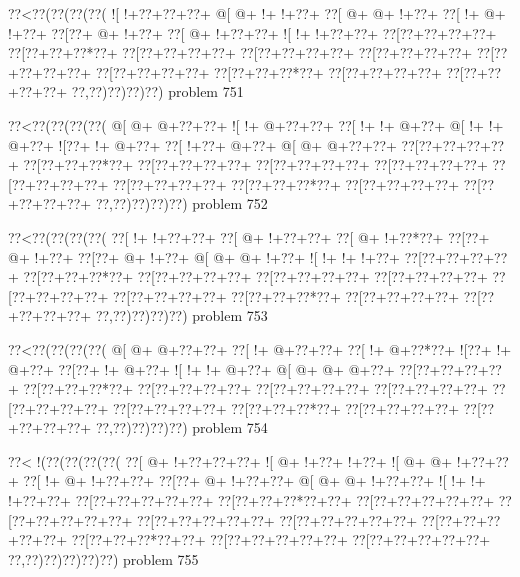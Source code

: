 \vbox{\vbox{\goo
\0??<\0??(\0??(\0??(\0??(
\- ![\- !+\0??+\0??+\0??+
\- @[\- @+\- !+\- !+\0??+
\0??[\- @+\- @+\- !+\0??+
\0??[\- !+\- @+\- !+\0??+
\0??[\0??+\- @+\- !+\0??+
\0??[\- @+\- !+\0??+\0??+
\- ![\- !+\- !+\0??+\0??+
\0??[\0??+\0??+\0??+\0??+
\0??[\0??+\0??+\0??*\0??+
\0??[\0??+\0??+\0??+\0??+
\0??[\0??+\0??+\0??+\0??+
\0??[\0??+\0??+\0??+\0??+
\0??[\0??+\0??+\0??+\0??+
\0??[\0??+\0??+\0??+\0??+
\0??[\0??+\0??+\0??*\0??+
\0??[\0??+\0??+\0??+\0??+
\0??[\0??+\0??+\0??+\0??+
\0??,\0??)\0??)\0??)\0??)
}
\hfil problem 751\hfil\break
}

\vbox{\vbox{\goo
\0??<\0??(\0??(\0??(\0??(
\- @[\- @+\- @+\0??+\0??+
\- ![\- !+\- @+\0??+\0??+
\0??[\- !+\- !+\- @+\0??+
\- @[\- !+\- !+\- @+\0??+
\- ![\0??+\- !+\- @+\0??+
\0??[\- !+\0??+\- @+\0??+
\- @[\- @+\- @+\0??+\0??+
\0??[\0??+\0??+\0??+\0??+
\0??[\0??+\0??+\0??*\0??+
\0??[\0??+\0??+\0??+\0??+
\0??[\0??+\0??+\0??+\0??+
\0??[\0??+\0??+\0??+\0??+
\0??[\0??+\0??+\0??+\0??+
\0??[\0??+\0??+\0??+\0??+
\0??[\0??+\0??+\0??*\0??+
\0??[\0??+\0??+\0??+\0??+
\0??[\0??+\0??+\0??+\0??+
\0??,\0??)\0??)\0??)\0??)
}
\hfil problem 752\hfil\break
}

\vbox{\vbox{\goo
\0??<\0??(\0??(\0??(\0??(
\0??[\- !+\- !+\0??+\0??+
\0??[\- @+\- !+\0??+\0??+
\0??[\- @+\- !+\0??*\0??+
\0??[\0??+\- @+\- !+\0??+
\0??[\0??+\- @+\- !+\0??+
\- @[\- @+\- @+\- !+\0??+
\- ![\- !+\- !+\- !+\0??+
\0??[\0??+\0??+\0??+\0??+
\0??[\0??+\0??+\0??*\0??+
\0??[\0??+\0??+\0??+\0??+
\0??[\0??+\0??+\0??+\0??+
\0??[\0??+\0??+\0??+\0??+
\0??[\0??+\0??+\0??+\0??+
\0??[\0??+\0??+\0??+\0??+
\0??[\0??+\0??+\0??*\0??+
\0??[\0??+\0??+\0??+\0??+
\0??[\0??+\0??+\0??+\0??+
\0??,\0??)\0??)\0??)\0??)
}
\hfil problem 753\hfil\break
}

\vbox{\vbox{\goo
\0??<\0??(\0??(\0??(\0??(
\- @[\- @+\- @+\0??+\0??+
\0??[\- !+\- @+\0??+\0??+
\0??[\- !+\- @+\0??*\0??+
\- ![\0??+\- !+\- @+\0??+
\0??[\0??+\- !+\- @+\0??+
\- ![\- !+\- !+\- @+\0??+
\- @[\- @+\- @+\- @+\0??+
\0??[\0??+\0??+\0??+\0??+
\0??[\0??+\0??+\0??*\0??+
\0??[\0??+\0??+\0??+\0??+
\0??[\0??+\0??+\0??+\0??+
\0??[\0??+\0??+\0??+\0??+
\0??[\0??+\0??+\0??+\0??+
\0??[\0??+\0??+\0??+\0??+
\0??[\0??+\0??+\0??*\0??+
\0??[\0??+\0??+\0??+\0??+
\0??[\0??+\0??+\0??+\0??+
\0??,\0??)\0??)\0??)\0??)
}
\hfil problem 754\hfil\break
}

\vbox{\vbox{\goo
\0??<\- !(\0??(\0??(\0??(\0??(
\0??[\- @+\- !+\0??+\0??+\0??+
\- ![\- @+\- !+\0??+\- !+\0??+
\- ![\- @+\- @+\- !+\0??+\0??+
\0??[\- !+\- @+\- !+\0??+\0??+
\0??[\0??+\- @+\- !+\0??+\0??+
\- @[\- @+\- @+\- !+\0??+\0??+
\- ![\- !+\- !+\- !+\0??+\0??+
\0??[\0??+\0??+\0??+\0??+\0??+
\0??[\0??+\0??+\0??*\0??+\0??+
\0??[\0??+\0??+\0??+\0??+\0??+
\0??[\0??+\0??+\0??+\0??+\0??+
\0??[\0??+\0??+\0??+\0??+\0??+
\0??[\0??+\0??+\0??+\0??+\0??+
\0??[\0??+\0??+\0??+\0??+\0??+
\0??[\0??+\0??+\0??*\0??+\0??+
\0??[\0??+\0??+\0??+\0??+\0??+
\0??[\0??+\0??+\0??+\0??+\0??+
\0??,\0??)\0??)\0??)\0??)\0??)
}
\hfil problem 755\hfil\break
}

